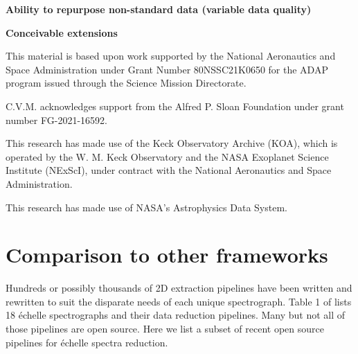 \documentclass[twocolumn]{aastex631}
\begin{document}
\begin{mdframed}
  \textbf{Ability to repurpose non-standard data (variable data quality)} \par
  \textcolor{lightgray}{\lipsum[15]}
\end{mdframed}


\begin{mdframed}
  \textbf{Conceivable extensions} \par
  \textcolor{lightgray}{\lipsum[16]}
\end{mdframed}



\begin{acknowledgements}
  This material is based upon work supported by the National Aeronautics and Space Administration under Grant Number 80NSSC21K0650 for the ADAP program issued through the Science Mission Directorate.

  C.V.M. acknowledges support from the Alfred P. Sloan Foundation under grant number FG-2021-16592.

  This research has made use of the Keck Observatory Archive (KOA), which is operated by the W. M. Keck Observatory and the NASA Exoplanet Science Institute (NExScI), under contract with the National Aeronautics and Space Administration.

  This research has made use of NASA's Astrophysics Data System.
\end{acknowledgements}




\appendix

\section{Comparison to other frameworks}

Hundreds or possibly thousands of 2D extraction pipelines have been written and rewritten to suit the disparate needs of each unique spectrograph.  Table 1 of \citet{2022PASP..134k4509C} lists 18 \'echelle spectrographs and their data reduction pipelines.  Many but not all of those pipelines are open source.  Here we list a subset of recent open source pipelines for \'echelle spectra reduction.
\end{document}

